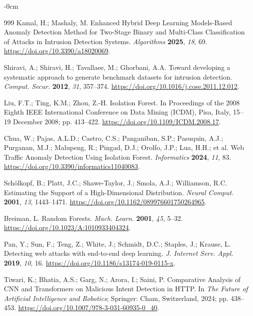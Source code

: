 \documentclass[futureinternet,article,submit,moreauthors]{Definitions/mdpi}
\begin{document}
\begin{adjustwidth}{-\extralength}{0cm}
\begin{thebibliography}{999}
Kamal, H.; Mashaly, M. Enhanced Hybrid Deep Learning Models-Based Anomaly Detection Method for Two-Stage Binary and Multi-Class Classification of Attacks in Intrusion Detection Systems. \emph{Algorithms} \textbf{2025}, \emph{18}, 69. \url{https://doi.org/10.3390/a18020069}.

Shiravi, A.; Shiravi, H.; Tavallaee, M.; Ghorbani, A.A. Toward developing a systematic approach to generate benchmark datasets for intrusion detection. \emph{Comput. Secur.} \textbf{2012}, \emph{31}, 357--374. \url{https://doi.org/10.1016/j.cose.2011.12.012}.

Liu, F.T.; Ting, K.M.; Zhou, Z.-H. Isolation Forest. In Proceedings of the 2008 Eighth IEEE International Conference on Data Mining (ICDM), Pisa, Italy, 15--19 December 2008; pp. 413--422. \url{https://doi.org/10.1109/ICDM.2008.17}.

Chua, W.; Pajas, A.L.D.; Castro, C.S.; Panganiban, S.P.; Pasuquin, A.J.; Purganan, M.J.; Malupeng, R.; Pingad, D.J.; Orolfo, J.P.; Lua, H.H.; et al. Web Traffic Anomaly Detection Using Isolation Forest. \emph{Informatics} \textbf{2024}, \emph{11}, 83. \url{https://doi.org/10.3390/informatics11040083}.

Sch\"{o}lkopf, B.; Platt, J.C.; Shawe-Taylor, J.; Smola, A.J.; Williamson, R.C. Estimating the Support of a High-Dimensional Distribution. \emph{Neural Comput.} \textbf{2001}, \emph{13}, 1443--1471. \url{https://doi.org/10.1162/089976601750264965}.

Breiman, L. Random Forests. \emph{Mach. Learn.} \textbf{2001}, \emph{45}, 5--32. \url{https://doi.org/10.1023/A:1010933404324}.

Pan, Y.; Sun, F.; Teng, Z.; White, J.; Schmidt, D.C.; Staples, J.; Krause, L. Detecting web attacks with end-to-end deep learning. \emph{J. Internet Serv. Appl.} \textbf{2019}, \emph{10}, 16. \url{https://doi.org/10.1186/s13174-019-0115-x}.

Tiwari, K.; Bhatia, A.S.; Garg, N.; Arora, I.; Saini, P. Comparative Analysis of CNN and Transformers on Malicious Intent Detection in HTTP. In \emph{The Future of Artificial Intelligence and Robotics}; Springer: Cham, Switzerland, 2024; pp. 438--453. \url{https://doi.org/10.1007/978-3-031-60935-0_40}.


\end{thebibliography}
\end{adjustwidth}
\end{document}
